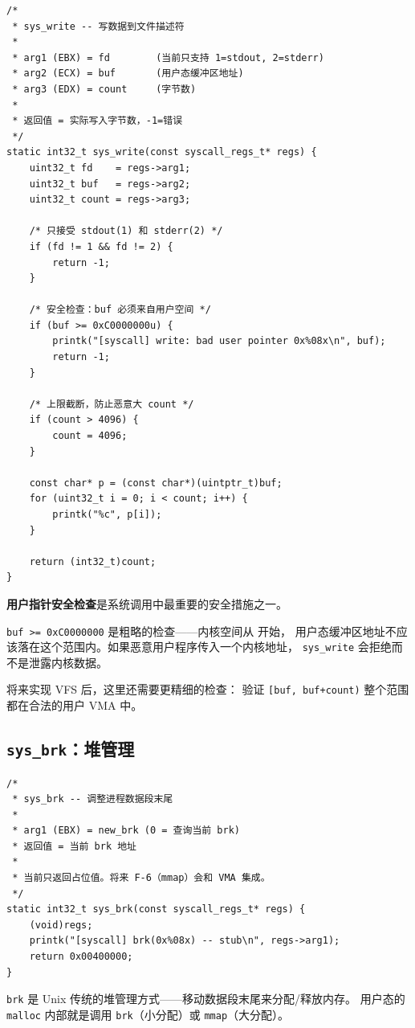\begin{lstlisting}[style=cstyle]
/*
 * sys_write -- 写数据到文件描述符
 *
 * arg1 (EBX) = fd        (当前只支持 1=stdout, 2=stderr)
 * arg2 (ECX) = buf       (用户态缓冲区地址)
 * arg3 (EDX) = count     (字节数)
 *
 * 返回值 = 实际写入字节数，-1=错误
 */
static int32_t sys_write(const syscall_regs_t* regs) {
    uint32_t fd    = regs->arg1;
    uint32_t buf   = regs->arg2;
    uint32_t count = regs->arg3;

    /* 只接受 stdout(1) 和 stderr(2) */
    if (fd != 1 && fd != 2) {
        return -1;
    }

    /* 安全检查：buf 必须来自用户空间 */
    if (buf >= 0xC0000000u) {
        printk("[syscall] write: bad user pointer 0x%08x\n", buf);
        return -1;
    }

    /* 上限截断，防止恶意大 count */
    if (count > 4096) {
        count = 4096;
    }

    const char* p = (const char*)(uintptr_t)buf;
    for (uint32_t i = 0; i < count; i++) {
        printk("%c", p[i]);
    }

    return (int32_t)count;
}
\end{lstlisting}

\begin{warnbox}
\textbf{用户指针安全检查}是系统调用中最重要的安全措施之一。

\texttt{buf >= 0xC0000000} 是粗略的检查——内核空间从  开始，
用户态缓冲区地址不应该落在这个范围内。如果恶意用户程序传入一个内核地址，
\texttt{sys\_write} 会拒绝而不是泄露内核数据。

将来实现 VFS 后，这里还需要更精细的检查：
验证 \texttt{[buf, buf+count)} 整个范围都在合法的用户 VMA 中。
\end{warnbox}

\subsection{\texttt{sys\_brk}：堆管理}

\begin{lstlisting}[style=cstyle]
/*
 * sys_brk -- 调整进程数据段末尾
 *
 * arg1 (EBX) = new_brk (0 = 查询当前 brk)
 * 返回值 = 当前 brk 地址
 *
 * 当前只返回占位值。将来 F-6（mmap）会和 VMA 集成。
 */
static int32_t sys_brk(const syscall_regs_t* regs) {
    (void)regs;
    printk("[syscall] brk(0x%08x) -- stub\n", regs->arg1);
    return 0x00400000;
}
\end{lstlisting}

\texttt{brk} 是 Unix 传统的堆管理方式——移动数据段末尾来分配/释放内存。
用户态的 \texttt{malloc} 内部就是调用 \texttt{brk}（小分配）或 \texttt{mmap}（大分配）。
